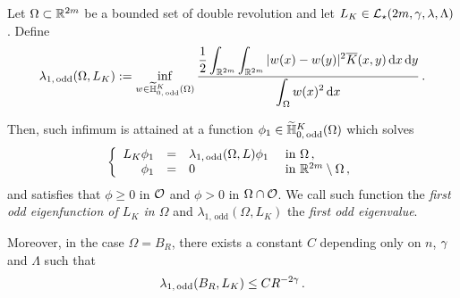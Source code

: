 \begin{lemma}
	\label{Lemma:FirstOddEigenfunction}
	Let $\Omega\subset \mathbb{R}^{2m} $ be a bounded set of double revolution and let $L_K\in \mathcal{L}_\star(2m,\gamma,\lambda, \Lambda)$. Define 
	\begin{equation}
	\label{Eq:DefLambda1}
	\lambda_{1, \, \mathrm{odd}}(\Omega, L_K) := \inf_{w \in \widetilde{\mathbb{H}}^K_{0, \, \mathrm{odd}}(\Omega)} \dfrac{\dfrac{1}{2}  \displaystyle\int_{\mathbb{R}^{2m}} \int_{\mathbb{R}^{2m}} |w(x) - w(y)|^2 \overline{K}(x,y) \,\mathrm{d} x \,\mathrm{d} y}{ \displaystyle \int_\Omega w(x)^2 \,\mathrm{d} x}\,.
	\end{equation}
	
	Then, such infimum is attained at a function $\phi_1\in \widetilde{\mathbb{H}}^K_{0, \, \mathrm{odd}}(\Omega)$ which solves
	$$
	\left\{\begin{array}{rcll}
	L_K \phi_1 &=& \lambda_{1, \, \mathrm{odd}}(\Omega, L) \phi_1 & \textrm{ in } \Omega\,,\\
	\phi_1 & = & 0 & \textrm{ in } \mathbb{R}^{2m}\setminus \Omega\,,
	\end{array} \right.
	$$
	and satisfies that $\phi \geq 0$ in $\mathcal{O}$ and $\phi > 0$ in $\Omega \cap \mathcal{O}$.
	We call such function the \emph{first odd eigenfunction of $L_K$ in $\Omega$} and $\lambda_{1, \, \mathrm{odd}}(\Omega, L_K) $ the \emph{first odd eigenvalue}. 
	
	Moreover, in the case $\Omega = B_R$, there exists a constant $C$ depending only on $n$, $\gamma$ and $\Lambda$ such that
	$$
	\lambda_{1, \, \mathrm{odd}}(B_R, L_K) \leq C R^{-2\gamma}\,. 
	$$ 
\end{lemma}


